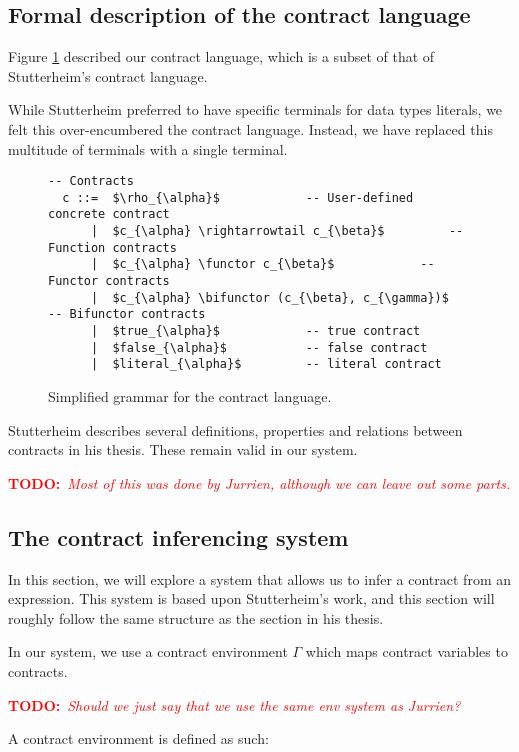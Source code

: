 \documentclass[10pt]{report}
\makeatletter
\newcommand{\functor}{<\!\!\!@\!\!\!>}
\newcommand{\bifunctor}{<\!\!\!@\!\!@\!\!\!>}
\newcommand{\annotate}[3]{
	\begin{scriptsize}
	\textcolor{#1}{\textbf{#2}~\textit{#3}}
	\end{scriptsize}\newline}
\newcommand{\todo}[1]{\annotate{red} {TODO:} {#1}}
\newcommand{\code}[1]{%
  {%
   \setlength{\fboxsep}{-2\fboxrule}%
   \fcolorbox{black}{light-gray}{\hspace{1.5pt}\strut\texttt{#1}\hspace{1.5pt}}%
  }%
}
\makeatother
\begin{document}
\subsection{Formal description of the contract language}
Figure \ref{fig:contract-grammar} described our contract language, which is a subset of that of Stutterheim's contract language.

While Stutterheim preferred to have specific terminals for data types literals, we felt this over-encumbered the contract language.
Instead, we have replaced this multitude of terminals with a single \code{literal} terminal.

\begin{figure}[htbp]
\begin{center}
\begin{lstlisting}[mathescape]
  -- Contracts
  c ::=  $\rho_{\alpha}$			-- User-defined concrete contract
      |  $c_{\alpha} \rightarrowtail c_{\beta}$			-- Function contracts
      |  $c_{\alpha} \functor c_{\beta}$			-- Functor contracts
      |  $c_{\alpha} \bifunctor (c_{\beta}, c_{\gamma})$			-- Bifunctor contracts
      |  $true_{\alpha}$			-- true contract
      |  $false_{\alpha}$			-- false contract
      |  $literal_{\alpha}$			-- literal contract
\end{lstlisting}
\end{center}
\caption{\label{fig:contract-grammar}Simplified grammar for the contract language.}
\end{figure}

Stutterheim describes several definitions, properties and relations between contracts in his thesis.
These remain valid in our system.

\todo{Most of this was done by Jurrien, although we can leave out some parts.}



\subsection{The contract inferencing system}
In this section, we will explore a system that allows us to infer a contract from an expression.
This system is based upon Stutterheim's work, and this section will roughly follow the same structure as the section in his thesis.

In our system, we use a contract environment $\Gamma$ which maps contract variables to contracts.
\todo{Should we just say that we use the same env system as Jurrien?}
A contract environment is defined as such:
\end{document}
